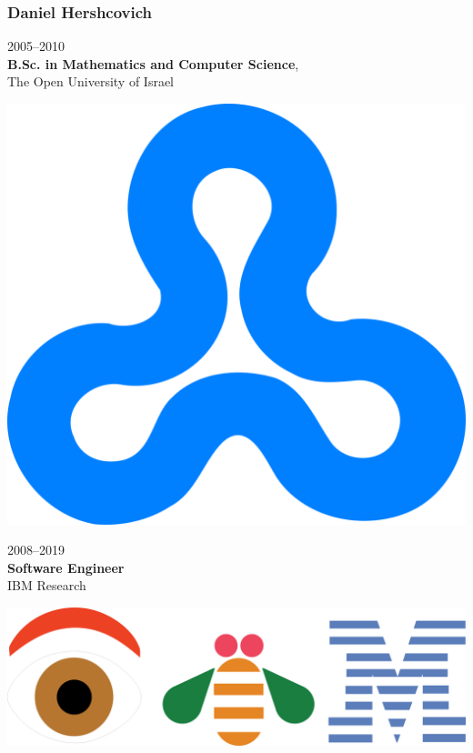 \documentclass[t,xcolor={svgnames,table}]{beamer}
\begin{document}
\begin{frame}
\frametitle{Daniel Hershcovich}
\begin{minipage}{.7\textwidth}
2005--2010 \\
\textbf{B.Sc. in Mathematics and Computer Science}, \\
The Open University of Israel
\end{minipage}
\begin{minipage}{.2\textwidth}
\includegraphics[width=\textwidth]{Open_university_israel_logo.png}
\end{minipage}

\vfill\pause

\begin{minipage}{.7\textwidth}
2008--2019 \\
\textbf{Software Engineer} \\
IBM Research
\end{minipage}
\begin{minipage}{.25\textwidth}
\includegraphics[width=\textwidth]{eye_bee_m.png}
\end{minipage}


\end{frame}
\end{document}
